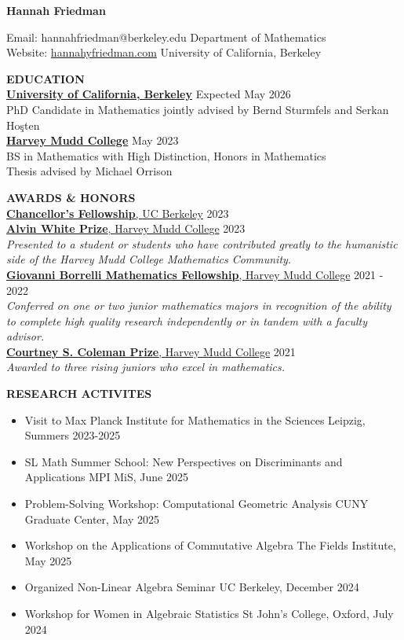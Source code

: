 \documentclass[11pt]{article}
\newcommand{\hdr}[1]{\textcolor{blue(ryb)}{\textbf{#1}}}
\newcommand{\role}[3]{\underline{\textbf{#1}, {#2}} \hfill #3}
\begin{document}
\begin{center}
\hdr{\Large{Hannah Friedman}}\\
\end{center}
Email: hannahfriedman@berkeley.edu \hfill Department of Mathematics\\
Website: \url{hannahyfriedman.com} \hfill University of California, Berkeley

\bigskip
\raggedright
\hdr{EDUCATION}\\
\textbf{\underline{University of California, Berkeley}} \hfill Expected May 2026\\
PhD Candidate in Mathematics jointly advised by Bernd Sturmfels and Serkan Ho\c{s}ten\\
\textbf{\underline{Harvey Mudd College}} \hfill May 2023\\
BS in Mathematics with High Distinction, Honors in Mathematics\\
Thesis advised by Michael Orrison

\bigskip

\hdr{AWARDS \& HONORS}\\
\role{Chancellor's Fellowship}{UC Berkeley}{2023}\\
\role{Alvin White Prize}{Harvey Mudd College}{2023}\\
\textit{Presented to a student or students who have contributed greatly to the humanistic side of the Harvey Mudd College Mathematics Community.}\\
\role{Giovanni Borrelli Mathematics Fellowship}{Harvey Mudd College}{2021 - 2022}\\
\textit{Conferred on one or two junior mathematics majors in recognition of the ability to complete high quality research independently or in tandem with a faculty advisor.}\\
\role{Courtney S. Coleman Prize}{Harvey Mudd College}{2021}\\
\textit{Awarded to three rising juniors who excel in mathematics.}

\bigskip

\hdr{RESEARCH ACTIVITES}\\
\begin{itemize}
\item Visit to Max Planck Institute for Mathematics in the Sciences \hfill Leipzig, Summers 2023-2025  
  \item SL Math Summer School: New Perspectives on Discriminants and Applications \hfill MPI MiS, June 2025
  \item Problem-Solving Workshop: Computational Geometric Analysis \hfill CUNY Graduate Center, May 2025
  \item Workshop on the Applications of Commutative Algebra \hfill The Fields Institute, May 2025
  \item Organized Non-Linear Algebra Seminar \hfill UC Berkeley, December 2024
  \item Workshop for Women in Algebraic Statistics \hfill St John's College, Oxford, July 2024
\end{itemize}
\end{document}

